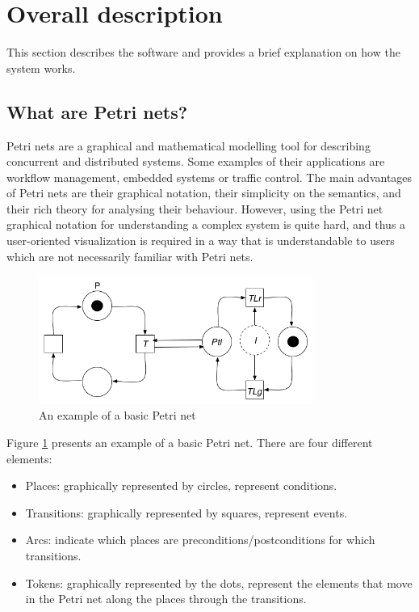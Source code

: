 \section{Overall description}

This section describes the software and provides a brief explanation on how the system works.

\subsection{What are Petri nets?}

Petri nets are a graphical and mathematical modelling tool for describing concurrent and distributed systems. Some examples of their applications are workflow management, embedded systems or traffic control. The main advantages of Petri nets are their graphical notation, their simplicity on the semantics, and their rich theory for analysing their behaviour. However, using the Petri net graphical notation for understanding a complex system is quite hard, and thus a user-oriented visualization is required in a way that is understandable to users which are not necessarily familiar with Petri nets.


\begin{figure}[htp]
\begin{center}
  \includegraphics[width=0.8\textwidth]{image/petrinet_diagram.png}
  \caption{An example of a basic Petri net}
  \label{fig:petrinet}
\end{center}
\end{figure}

Figure \ref{fig:petrinet} presents an example of a basic Petri net. There are four different elements:

\begin{itemize}
\item Places: graphically represented by circles, represent conditions.
\item Transitions: graphically represented by squares, represent events.
\item Arcs: indicate which places are preconditions/postconditions for which transitions.
\item Tokens: graphically represented by the dots, represent the elements that move in the Petri net along the places through the transitions.
\end{itemize}


